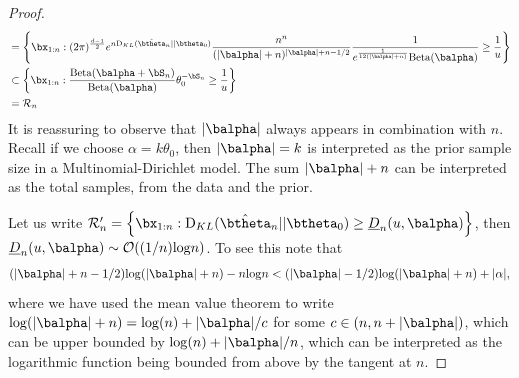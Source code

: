 \documentclass[11pt]{article}
\def\log{{\rm log}}
\newcommand{\Beta}{\mathrm{Beta}}
\newcommand{\KL}{\mathrm{D}_{KL}}
\begin{document}
\begin{proof}
\begin{align*}
  &= \left\{ \bx_{1:n} : 
  (2\pi)^{\frac{d-1}{2}}
    e^{n \KL(\hat\btheta_n|| \btheta_0)}
    \frac{n^{n}}{(|\balpha|+n)^{|\balpha| + n - 1/2}}
    \frac{ 1}{e^{\frac{1}{12(|\balpha|+n)}}\Beta(\balpha)} \geq \frac{1}{u} \right\}\\
   &\subset \left\{ \bx_{1:n} : 
    \frac{\Beta(\balpha + \bS_n)}
  {\Beta(\balpha)} \theta_0^{-\bS_n} \geq \frac{1}{u}
\right\}\\
    &= \mathcal{R}_n\\
\end{align*}
It is reassuring to observe that $|\balpha|$ always appears in combination with $n$. Recall if we choose $\alpha=k\theta_0$, then $|\balpha|=k$ is interpreted as the prior sample size in a Multinomial-Dirichlet model.
The sum $|\balpha|+n$ can be interpreted as the total samples, from the data and the prior.

Let us write $\mathcal{R}_n' = \left\{ \bx_{1:n} : \KL(\hat\btheta_n|| \btheta_0) \geq \underline{D}_n(u,\balpha) \right\}$, then $\underline{D}_n(u,\balpha) \sim \mathcal{O}((1/n)\log n)$.
To see this note that 
\begin{align*}
  (|\balpha|+n-1/2)\log(|\balpha|+n)-n\log n < (|\balpha|-1/2)\log(|\balpha|+n) + |\alpha|,
\end{align*}
where we have used the mean value theorem to write $\log(|\balpha|+n) = \log(n) +  |\balpha|/c$ for some $c\in (n, n+|\balpha|)$, 
which can be upper bounded by $\log(n) + |\balpha|/n$, which can be interpreted as the logarithmic function being bounded from above by the tangent at $n$.
\end{proof}
\end{document}
